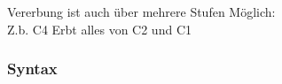 \noindent
\begin{minipage}{0.6\columnwidth}
\begin{center}
\end{center}
\end{minipage}
\begin{minipage}{0.4\columnwidth}
    Vererbung ist auch über mehrere Stufen Möglich:\\
    Z.b. C4 Erbt alles von C2 und C1
\end{minipage}

\subsubsection{Syntax}

